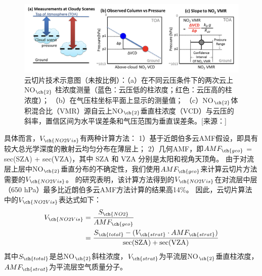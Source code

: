 \begin{figure}[H]
\centering
\includegraphics[width=\textwidth]{./figures/cloud-slicing_schematic.png}
\caption{云切片技术示意图（未按比例）：（a）在不同云压条件下的两次云上NO$_{\ch{2}}$ 柱浓度测量（蓝色：云压低的柱浓度；红色：云压高的柱浓度）；
（b）在气压柱坐标平面上显示的测量值； （c）NO$_{\ch{2}}$体积混合比（VMR）源自云上NO$_{\ch{2}}$垂直柱浓度（VCD）与云压的斜率，置信区间为水平误差条和气压范围为垂直误差条。[来源：\citet{Choi.2014}]\\
}
\label{fig:cloud-slicing_schematic}
\end{figure}

具体而言，$V_{\ch{NO2Vis}}$有两种计算方法：
1）基于近朗伯多云AMF假设，即具有较大总光学深度的散射云均匀分布在薄层上\citep{Choi.2014}；
2）几何AMF，即$AMF_{\ch{geo}}$ = sec(SZA) + sec(VZA)，其中 SZA 和 VZA 分别是太阳和视角天顶角\citep{Marais.2018,Marais.2021}。
由于对流层上层中NO$_{\ch{2}}$垂直分布的不确定性\citep{Travis.2016}，我们使用$AMF_{\ch{geo}}$来计算云切片方法需要的$V_{\ch{NO2Vis}}$。
\citet{Choi.2014}的研究表明，该计算方法得到的$V_{\ch{NO2Vis}}$在对流层中层（650 hPa）最多比近朗伯多云AMF方法计算的结果高14\%。
因此，云切片算法中的$V_{\ch{NO2Vis}}$表达式如下：
\begin{equation} \label{eq:AMF_geo}
\begin{split}
V_{\ch{NO2Vis}} & = \frac{S_{\ch{NO2}}}{AMF_{\ch{geo}}} \\
             & = \frac{S_{\ch{total}}-(V_{\ch{strat}} \cdot AMF_{\ch{strat}})}{\sec (\mathrm{SZA})+\sec (\mathrm{VZA})}
\end{split}
\end{equation}
其中$S_{\ch{total}}$是总NO$_{\ch{2}}$斜柱浓度，$V_{\ch{strat}}$为平流层NO$_{\ch{2}}$垂直柱浓度，$AMF_{\ch{strat}}$为平流层空气质量分子。


